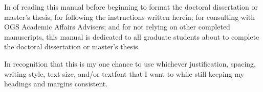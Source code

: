 \begin{dedication}
    \setsinglespacing
    \raggedright %
    \parindent0pt\parskip\baselineskip
    In of reading this manual before beginning to format the
    doctoral dissertation or master's thesis; for following the
    instructions written herein; for consulting with OGS Academic Affairs
    Advisers; and for not relying on other completed manuscripts, this
    manual is dedicated to all graduate students about to complete the
    doctoral dissertation or master's thesis.
    
    In recognition that this is my one chance to use whichever
    justification, spacing, writing style, text size, and/or textfont that
    I want to while still keeping my headings and margins consistent.
\end{dedication}